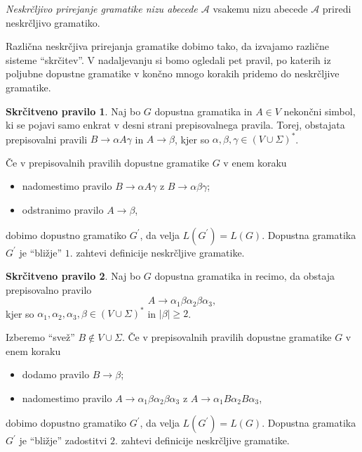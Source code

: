 \documentclass[fin1, tisk]{fmfdelo}
\providecommand{\abs}[1]{\left\lvert #1 \right\rvert}
\newcommand{\A}{\mathcal{A}}
\theoremstyle{definition}
\newtheorem{pravilo}{Skrčitveno pravilo}
\begin{document}
\begin{definicija}
    \emph{Neskrčljivo prirejanje gramatike nizu abecede $\A$} vsakemu nizu abecede $\A$ priredi
    neskrčljivo gramatiko.
\end{definicija}

Različna neskrčjiva prirejanja gramatike dobimo tako, da izvajamo različne sisteme ``skrčitev''.
V nadaljevanju si bomo ogledali pet pravil, po katerih iz poljubne dopustne gramatike v končno 
mnogo korakih pridemo do neskrčljive gramatike.

\begin{pravilo}
    Naj bo $G$ dopustna gramatika in $A \in V$ nekončni simbol, ki se pojavi samo 
    enkrat v desni strani prepisovalnega pravila. Torej, obstajata prepisovalni pravili 
    $B \rightarrow \alpha A \gamma$ in $A \rightarrow \beta$, kjer so 
    $\alpha, \beta, \gamma \in (V \cup \Sigma)^*$.

    Če v prepisovalnih pravilih dopustne gramatike $G$ v enem koraku
    \begin{itemize}
        \item nadomestimo pravilo $B \rightarrow \alpha A \gamma$ z $B \rightarrow \alpha \beta \gamma$;
        \item odstranimo pravilo $ A \rightarrow \beta$,
    \end{itemize}
    dobimo dopustno gramatiko $G^\prime$, da velja $L(G^\prime) = L(G)$. Dopustna gramatika 
    $G^\prime$ je ``bližje'' $1.$ zahtevi definicije neskrčljive gramatike.
\end{pravilo}

\begin{pravilo}
    Naj bo $G$ dopustna gramatika in recimo, da obstaja prepisovalno pravilo
    \[
        A \rightarrow \alpha_1 \beta \alpha_2 \beta \alpha_3,
    \]
    kjer so $\alpha_1, \alpha_2, \alpha_3, \beta \in (V \cup \Sigma)^*$ in $\abs{\beta} \geq 2$.

    Izberemo ``svež'' $B \notin V \cup \Sigma$. Če v prepisovalnih pravilih dopustne gramatike $G$ v enem koraku
    \begin{itemize}
        \item dodamo pravilo $B \rightarrow \beta$;
        \item nadomestimo pravilo $A \rightarrow \alpha_1 \beta \alpha_2 \beta \alpha_3$ z 
        $A \rightarrow \alpha_1 B \alpha_2 B \alpha_3$,
    \end{itemize}
    dobimo dopustno gramatiko $G^\prime$, da velja $L(G^\prime) = L(G)$. Dopustna gramatika 
    $G^\prime$ je ``bližje'' zadostitvi $2.$ zahtevi definicije neskrčljive gramatike.
\end{pravilo}
\end{document}
